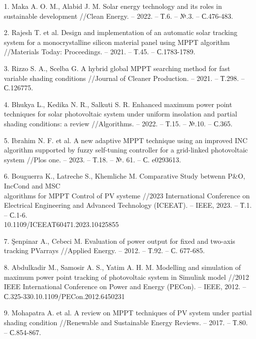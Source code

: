 \begin{references}
1. Maka A. O. M., Alabid J. M. Solar energy technology and its roles in
sustainable development //Clean Energy. -- 2022. -- Т.6. -- №.3. --
С.476-483.
\href{https://doi.org/10.1093/ce/zkac023}{}

2. Rajesh T. et al. Design and implementation of an automatic solar
tracking system for a monocrystalline silicon material panel using
MPPT algorithm //Materials Today: Proceedings. -- 2021. -- Т.45. --
С.1783-1789.
\href{https://doi.org/10.1016/j.matpr.2020.08.635}{}

3. Rizzo S. A., Scelba G. A hybrid global MPPT searching method for fast
variable shading conditions //Journal of Cleaner Production. -- 2021.
-- Т.298. -- С.126775.
\href{https://doi.org/10.1016/j.jclepro.2021.126775}{}

4. Bhukya L., Kedika N. R., Salkuti S. R. Enhanced maximum power point
techniques for solar photovoltaic system under uniform insolation and
partial shading conditions: a review //Algorithms. -- 2022. -- Т.15.
-- №.10. -- С.365.
\href{https://doi.org/10.3390/a15100365}{}

5. Ibrahim N. F. et al. A new adaptive MPPT technique using an improved
INC algorithm supported by fuzzy self-tuning controller for a
grid-linked photovoltaic system //Plos one. -- 2023. -- Т.18. -- №.
61. -- С. e0293613.
\href{https://doi.org/10.1371/journal.pone.0293613}{}

6. Bouguerra K., Latreche S., Khemliche M. Comparative Study betwenn
P\&O, IncCond and MSC \\algorithms for MPPT Control of PV systeme
//2023 International Conference on Electrical Engineering and Advanced
Technology (ICEEAT). -- IEEE, 2023. -- Т.1. -- С.1-6.\\
10.1109/ICEEAT60471.2023.10425855

7. Şenpinar A., Cebeci M. Evaluation of power output for fixed and
two-axis tracking PVarrays //Applied Energy. -- 2012. -- Т.92. -- С.
677-685.
\href{https://doi.org/10.1016/j.apenergy.2011.07.043}{}

8. Abdulkadir M., Samosir A. S., Yatim A. H. M. Modelling and simulation
of maximum power point tracking of photovoltaic system in Simulink
model //2012 IEEE International Conference on Power and Energy
(PECon). -- IEEE, 2012. -- С.325-330.10.1109/PECon.2012.6450231

9. Mohapatra A. et al. A review on MPPT techniques of PV system under
partial shading condition //Renewable and Sustainable Energy Reviews.
-- 2017. -- Т.80. -- С.854-867.
\href{https://doi.org/10.1016/j.rser.2017.05.083}{}


\end{references}
